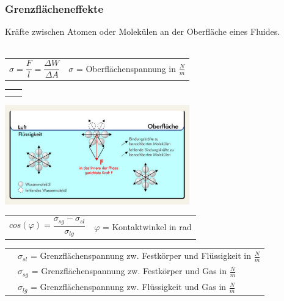 	\subsubsection{Grenzflächeneffekte}
		\begin{minipage}[t]{10.5cm}
			\newline
			Kräfte zwischen Atomen oder Molekülen an der Oberfläche eines Fluides.\\ \\
			\renewcommand{\arraystretch}{2.5}
			\begin{tabular}{ p{4cm} p{7cm}}
				$\sigma = \dfrac{F}{l} = \dfrac{\Delta W}{\Delta A}$	&	$\sigma$ = Oberflächenspannung in $\frac{N}{m}$\\
			\end{tabular}
			\renewcommand{\arraystretch}{1.5}
			\begin{tabular}{ p{4cm} p{7cm}}
				& \\
				& \\
			\end{tabular}
			\renewcommand{\arraystretch}{1}
		\end{minipage}
		\begin{minipage}[t]{10cm}
			\vspace{-\ht\strutbox}\includegraphics[width=8cm]{./bilder/VanDerWaalsKraft.jpg}
		\end{minipage}
		\newline
		\newline
		\newline
		\begin{minipage}[t]{12cm}
			\renewcommand{\arraystretch}{2.5}
			\begin{tabular}{ p{4cm} p{7cm}}
				$cos(\varphi) = \dfrac{\sigma_{sg}-\sigma_{sl}}{\sigma_{lg}}$	&	$\varphi$ = Kontaktwinkel in rad\\
			\end{tabular}
			\renewcommand{\arraystretch}{1.5}
			\begin{tabular}{ p{4cm} p{7cm}}
				& $\sigma_{sl}$ = Grenzflächenspannung zw. Festkörper und Flüssigkeit in $\frac{N}{m}$\\
				& $\sigma_{sg}$ = Grenzflächenspannung zw. Festkörper und Gas in $\frac{N}{m}$\\
				& $\sigma_{lg}$ = Grenzflächenspannung zw. Flüssigkeit und Gas in $\frac{N}{m}$\\
			\end{tabular}
			\renewcommand{\arraystretch}{1}
		\end{minipage}
